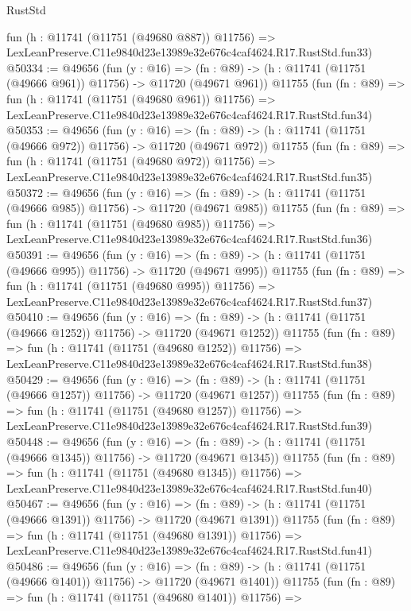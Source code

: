 \begin{lexlean}{RustStd}
\begin{coremodule}
    fun (h : @11741 (@11751 (@49680 @887)) @11756) =>
    LexLeanPreserve.C11e9840d23e13989e32e676c4caf4624.R17.RustStd.fun33)
@50334 := @49656
    (fun (y : @16) =>
    (fn : @89) -> (h : @11741 (@11751 (@49666 @961)) @11756) -> @11720 (@49671 @961))
    @11755
    (fun (fn : @89) =>
    fun (h : @11741 (@11751 (@49680 @961)) @11756) =>
    LexLeanPreserve.C11e9840d23e13989e32e676c4caf4624.R17.RustStd.fun34)
@50353 := @49656
    (fun (y : @16) =>
    (fn : @89) -> (h : @11741 (@11751 (@49666 @972)) @11756) -> @11720 (@49671 @972))
    @11755
    (fun (fn : @89) =>
    fun (h : @11741 (@11751 (@49680 @972)) @11756) =>
    LexLeanPreserve.C11e9840d23e13989e32e676c4caf4624.R17.RustStd.fun35)
@50372 := @49656
    (fun (y : @16) =>
    (fn : @89) -> (h : @11741 (@11751 (@49666 @985)) @11756) -> @11720 (@49671 @985))
    @11755
    (fun (fn : @89) =>
    fun (h : @11741 (@11751 (@49680 @985)) @11756) =>
    LexLeanPreserve.C11e9840d23e13989e32e676c4caf4624.R17.RustStd.fun36)
@50391 := @49656
    (fun (y : @16) =>
    (fn : @89) -> (h : @11741 (@11751 (@49666 @995)) @11756) -> @11720 (@49671 @995))
    @11755
    (fun (fn : @89) =>
    fun (h : @11741 (@11751 (@49680 @995)) @11756) =>
    LexLeanPreserve.C11e9840d23e13989e32e676c4caf4624.R17.RustStd.fun37)
@50410 := @49656
    (fun (y : @16) =>
    (fn : @89) -> (h : @11741 (@11751 (@49666 @1252)) @11756) -> @11720 (@49671 @1252))
    @11755
    (fun (fn : @89) =>
    fun (h : @11741 (@11751 (@49680 @1252)) @11756) =>
    LexLeanPreserve.C11e9840d23e13989e32e676c4caf4624.R17.RustStd.fun38)
@50429 := @49656
    (fun (y : @16) =>
    (fn : @89) -> (h : @11741 (@11751 (@49666 @1257)) @11756) -> @11720 (@49671 @1257))
    @11755
    (fun (fn : @89) =>
    fun (h : @11741 (@11751 (@49680 @1257)) @11756) =>
    LexLeanPreserve.C11e9840d23e13989e32e676c4caf4624.R17.RustStd.fun39)
@50448 := @49656
    (fun (y : @16) =>
    (fn : @89) -> (h : @11741 (@11751 (@49666 @1345)) @11756) -> @11720 (@49671 @1345))
    @11755
    (fun (fn : @89) =>
    fun (h : @11741 (@11751 (@49680 @1345)) @11756) =>
    LexLeanPreserve.C11e9840d23e13989e32e676c4caf4624.R17.RustStd.fun40)
@50467 := @49656
    (fun (y : @16) =>
    (fn : @89) -> (h : @11741 (@11751 (@49666 @1391)) @11756) -> @11720 (@49671 @1391))
    @11755
    (fun (fn : @89) =>
    fun (h : @11741 (@11751 (@49680 @1391)) @11756) =>
    LexLeanPreserve.C11e9840d23e13989e32e676c4caf4624.R17.RustStd.fun41)
@50486 := @49656
    (fun (y : @16) =>
    (fn : @89) -> (h : @11741 (@11751 (@49666 @1401)) @11756) -> @11720 (@49671 @1401))
    @11755
    (fun (fn : @89) =>
    fun (h : @11741 (@11751 (@49680 @1401)) @11756) =>

\end{coremodule}
\end{lexlean}
